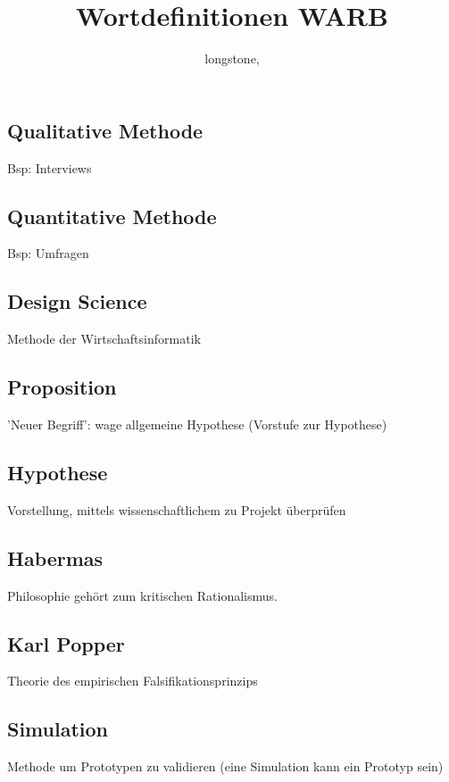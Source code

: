 \documentclass[DIV=calc, paper=a4, fontsize=11pt, twocolumn]{scrartcl}	 %
\title{Wortdefinitionen WARB} %
\author{longstone, } %
\date{} %
\begin{document}
\maketitle %

\thispagestyle{fancy} %



\subsection*{Qualitative Methode}
Bsp: Interviews

\subsection*{Quantitative Methode}
Bsp: Umfragen

\subsection*{Design Science}
Methode der Wirtschaftsinformatik

\subsection*{Proposition}
'Neuer Begriff': wage allgemeine Hypothese (Vorstufe zur Hypothese)

\subsection*{Hypothese}
Vorstellung, mittels wissenschaftlichem zu Projekt überprüfen

\subsection*{Habermas}
Philosophie gehört zum kritischen Rationalismus.

\subsection*{Karl Popper}
Theorie des empirischen Falsifikationsprinzips

\subsection*{Simulation}
Methode um Prototypen zu validieren (eine Simulation kann ein Prototyp sein)
\end{document}
